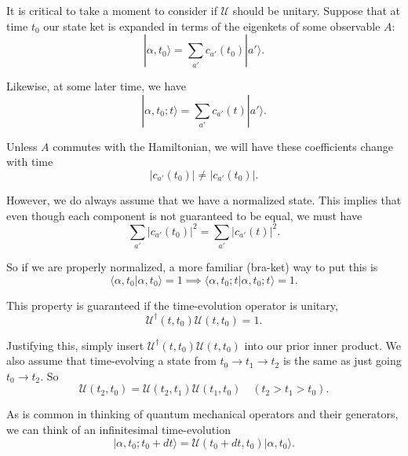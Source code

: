 \documentclass[12pt]{revtex4-2}
\begin{document}
It is critical to take a moment to consider if $\mathcal{U}$ should be unitary.  Suppose that at time $t_0$ our state ket is expanded in terms of the eigenkets of some observable $A$:
\begin{equation}
    |\alpha,t_0\rangle = \sum_{a'}c_{a'}(t_0)|a'\rangle.
\end{equation}

Likewise, at some later time, we have 
\begin{equation}
    |\alpha,t_0;t\rangle = \sum_{a'}c_{a'}(t)|a'\rangle.
\end{equation}

Unless $A$ commutes with the Hamiltonian, we will have these coefficients change with time 
\begin{equation}
    |c_{a'}(t_0)| \neq |c_{a'}(t_0)|.
\end{equation}

However, we do always assume that we have a normalized state.  This implies that even though each component is not guaranteed to be equal, we must have 
\begin{equation}
    \sum_{a'}|c_{a'}(t_0)|^2 = \sum_{a'}|c_{a'}(t)|^2.
\end{equation}

So if we are properly normalized, a more familiar (bra-ket) way to put this is 
\begin{equation}
    \langle \alpha , t_0 | \alpha,t_0\rangle = 1 \implies \langle \alpha , t_0 ; t | \alpha,t_0 ; t\rangle = 1.
\end{equation}

This property is guaranteed if the time-evolution operator is unitary,
\begin{equation}
    \mathcal{U}^\dagger(t,t_0)\mathcal{U}(t,t_0) = 1.
\end{equation}

Justifying this, simply insert $\mathcal{U}^\dagger(t,t_0)\mathcal{U}(t,t_0)$ into our prior inner product.  We also assume that time-evolving a state from $t_0 \to t_1 \to t_2$ is the same as just going $t_0 \to t_2$.  So 
\begin{equation}
    \mathcal{U}(t_2,t_0) = \mathcal{U}(t_2,t_1)\mathcal{U}(t_1,t_0) \quad (t_2 > t_1 > t_0).
\end{equation}

As is common in thinking of quantum mechanical operators and their generators, we can think of an infinitesimal time-evolution 
\begin{equation}
    |\alpha,t_0;t_0+dt\rangle = \mathcal{U}(t_0+dt,t_0)|\alpha,t_0\rangle.
\end{equation}
\end{document}
